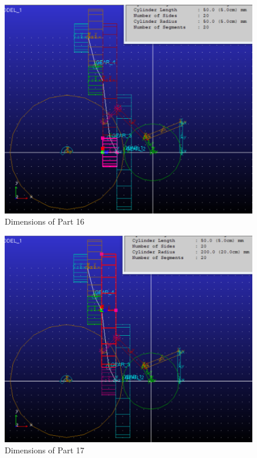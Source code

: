                \begin{figure}[hbt!]
                    \centering
                    \includegraphics[width=0.9\columnwidth]{Images/dim16.png}
                    \caption{Dimensions of Part 16}
                    \label{fig:dim16}
                \end{figure}

                \begin{figure}[hbt!]
                    \centering
                    \includegraphics[width=0.9\columnwidth]{Images/dim17.png}
                    \caption{Dimensions of Part 17}
                    \label{fig:dim17}
                \end{figure}

